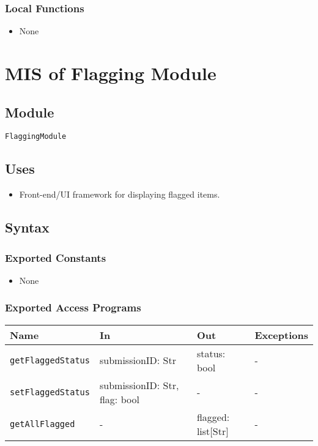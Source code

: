 \documentclass[12pt, titlepage]{article}
\begin{document}
\subsubsection{Local Functions}

\begin{itemize}
    \item None
\end{itemize}


\section{MIS of Flagging Module} \label{mFlagging}

\subsection{Module}

\texttt{FlaggingModule}

\subsection{Uses}

\begin{itemize}
    \item Front-end/UI framework for displaying flagged items.
\end{itemize}

\subsection{Syntax}

\subsubsection{Exported Constants}

\begin{itemize}
    \item None
\end{itemize}

\subsubsection{Exported Access Programs}

\begin{center}
\begin{tabular}{p{5cm} p{3.5cm} p{3.5cm} p{2cm}}
\hline
\textbf{Name} & \textbf{In} & \textbf{Out} & \textbf{Exceptions} \\
\hline
\texttt{getFlaggedStatus} & submissionID: Str & status: bool & - \\
\texttt{setFlaggedStatus} & submissionID: Str, flag: bool & - & - \\
\texttt{getAllFlagged} & - & flagged: list[Str] & - \\
\hline
\end{tabular}
\end{center}
\end{document}
